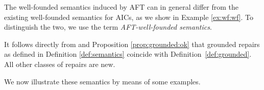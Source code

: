 
The well-founded semantics induced by AFT can in general differ from the existing well-founded semantics for AICs, as we show in Example \ref{ex:wf:wf}. To distinguish the two, we use the term \emph{AFT-well-founded semantics}. %

It follows directly from \citet[Proposition 3.2]{ijcai/BogaertsVD15} and Proposition \ref{prop:grounded:ok} that grounded repairs as defined in Definition \ref{def:semantics} coincide with  Definition~\ref{def:grounded}. 
All other classes of repairs are new. 

We now illustrate these semantics by means of some examples. 


